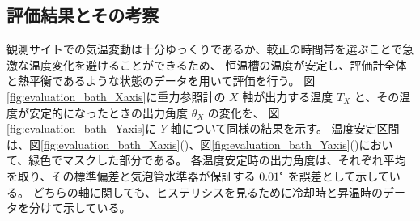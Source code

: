 \documentclass[../../main.tex]{subfiles}
\begin{document}
\subsection{評価結果とその考察}
観測サイトでの気温変動は十分ゆっくりであるか、較正の時間帯を選ぶことで急激な温度変化を避けることができるため、
恒温槽の温度が安定し、評価計全体と熱平衡であるような状態のデータを用いて評価を行う。
図\ref{fig:evaluation_bath_Xaxis}に重力参照計の $X$ 軸が出力する温度 $T_{X}$ と、その温度が安定的になったときの出力角度 $\theta_{X}$ の変化を、
図\ref{fig:evaluation_bath_Yaxis}に $Y$ 軸について同様の結果を示す。
温度安定区間は、図\ref{fig:evaluation_bath_Xaxis}()、図\ref{fig:evaluation_bath_Yaxis}()において、緑色でマスクした部分である。
各温度安定時の出力角度は、それぞれ平均を取り、その標準偏差と気泡管水準器が保証する $0.01\tcdegree$ を誤差として示している。
どちらの軸に関しても、ヒステリシスを見るために冷却時と昇温時のデータを分けて示している。
\end{document}
